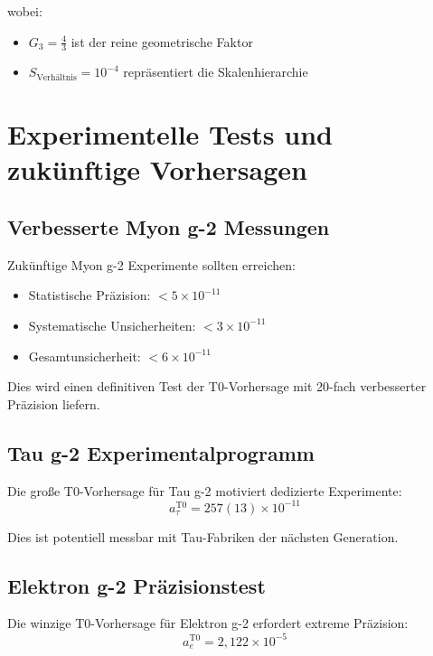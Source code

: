 \documentclass[12pt,a4paper]{report}
\begin{document}
	wobei:
	\begin{itemize}
		\item $G_3 = \frac{4}{3}$ ist der reine geometrische Faktor
		\item $S_{\text{Verhältnis}} = 10^{-4}$ repräsentiert die Skalenhierarchie
	\end{itemize}
	
	\section{Experimentelle Tests und zukünftige Vorhersagen}
	\label{sec:experimental_tests}
	
	\subsection{Verbesserte Myon g-2 Messungen}
	\label{subsec:improved_muon_measurements}
	
	Zukünftige Myon g-2 Experimente sollten erreichen:
	\begin{itemize}
		\item Statistische Präzision: $< 5 \times 10^{-11}$
		\item Systematische Unsicherheiten: $< 3 \times 10^{-11}$
		\item Gesamtunsicherheit: $< 6 \times 10^{-11}$
	\end{itemize}
	
	Dies wird einen definitiven Test der T0-Vorhersage mit 20-fach verbesserter Präzision liefern.
	
	\subsection{Tau g-2 Experimentalprogramm}
	\label{subsec:tau_g2_program}
	
	Die große T0-Vorhersage für Tau g-2 motiviert dedizierte Experimente:
	\begin{equation}
		a_\tau^{\text{T0}} = 257(13) \times 10^{-11}
		\label{eq:tau_prediction}
	\end{equation}
	
	Dies ist potentiell messbar mit Tau-Fabriken der nächsten Generation.
	
	\subsection{Elektron g-2 Präzisionstest}
	\label{subsec:electron_g2_precision}
	
	Die winzige T0-Vorhersage für Elektron g-2 erfordert extreme Präzision:
	\begin{equation}
		a_e^{\text{T0}} = 2,122 \times 10^{-5}
		\label{eq:electron_prediction}
	\end{equation}
	
\end{document}
